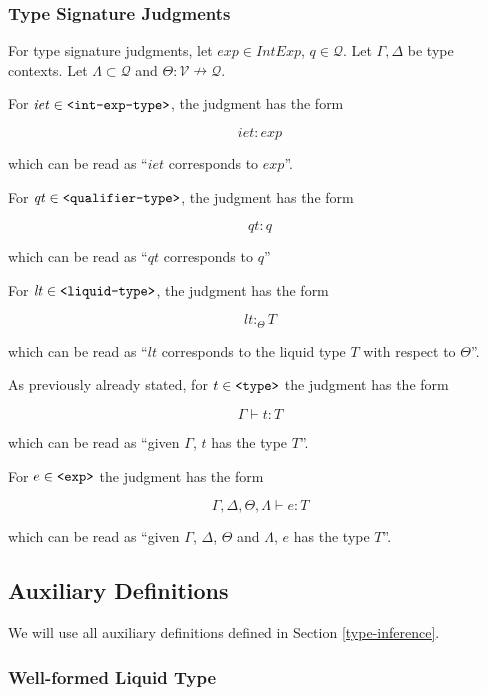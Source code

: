 \documentclass[]{scrbook}
\newcommand{\mf}[1]{\text{\texttt{#1}}}
\theoremstyle{definition}
\theoremstyle{definition}
\theoremstyle{definition}
\theoremstyle{remark}
\begin{document}
\subsubsection{Type Signature
Judgments}\label{type-signature-judgments-1}

For type signature judgments, let \(\mathit{exp}\in\mathit{IntExp}\),
\(q\in\mathcal{Q}\). Let \(\Gamma,\Delta\) be type contexts. Let
\(\Lambda\subset\mathcal{Q}\) and
\(\Theta:\mathcal{V}\nrightarrow\mathcal{Q}\).

For \(\mathit{iet}\in\mf{<int-exp-type>}\), the judgment has the form

\[
\mathit{iet}:\mathit{exp}
\]

which can be read as \enquote{\(\mathit{iet}\) corresponds to
\(\mathit{exp}\)}.

For \(\mathit{qt}\in\mf{<qualifier-type>}\), the judgment has the form

\[
\mathit{qt}:q
\]

which can be read as \enquote{\(\mathit{qt}\) corresponds to \(q\)}

For \(\mathit{lt}\in\mf{<liquid-type>}\), the judgment has the form

\[
\mathit{lt}:_\Theta T
\]

which can be read as
\enquote{$\mathit{lt}$ corresponds to the liquid type $T$ with respect to $\Theta$}.

As previously already stated, for \(t\in\mf{<type>}\) the judgment has
the form

\[
\Gamma\vdash t:T
\]

which can be read as \enquote{given \(\Gamma\), \(t\) has the type
\(T\)}.

For \(e\in\mf{<exp>}\) the judgment has the form

\[
\Gamma,\Delta,\Theta,\Lambda\vdash e:T
\]

which can be read as \enquote{given \(\Gamma\), \(\Delta\), \(\Theta\)
and \(\Lambda\), \(e\) has the type \(T\)}.

\subsection{Auxiliary Definitions}\label{auxiliary-definitions-1}

We will use all auxiliary definitions defined in Section
\ref{type-inference}.

\subsubsection*{Well-formed Liquid Type}\label{well-formed-liquid-type}
\end{document}
